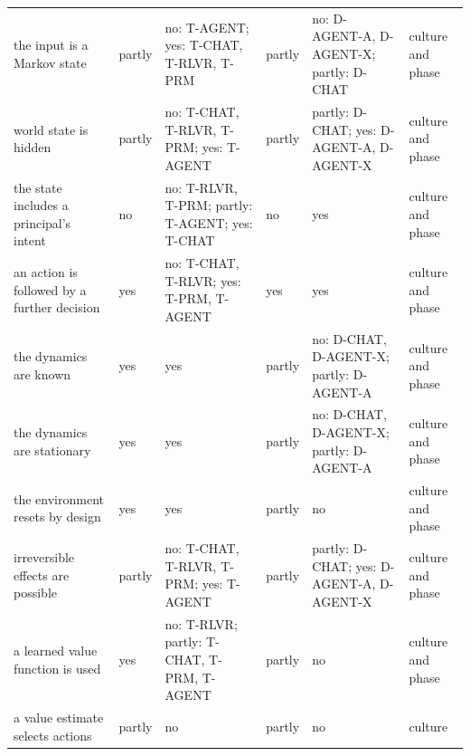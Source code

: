 \documentclass{article}
\begin{document}
\begin{table}[!htb]
\begin{tabularx}{\textwidth}{@{}>{\raggedright\arraybackslash}Xl>{\raggedright\arraybackslash}Xl>{\raggedright\arraybackslash}X>{\raggedright\arraybackslash}X@{}}
the input is a Markov state & partly & no: T-AGENT; yes: T-CHAT, T-RLVR, T-PRM & partly & no: D-AGENT-A, D-AGENT-X; partly: D-CHAT & culture and phase \\
world state is hidden & partly & no: T-CHAT, T-RLVR, T-PRM; yes: T-AGENT & partly & partly: D-CHAT; yes: D-AGENT-A, D-AGENT-X & culture and phase \\
the state includes a principal's intent & no & no: T-RLVR, T-PRM; partly: T-AGENT; yes: T-CHAT & no & yes & culture and phase \\
an action is followed by a further decision & yes & no: T-CHAT, T-RLVR; yes: T-PRM, T-AGENT & yes & yes & culture and phase \\
the dynamics are known & yes & yes & partly & no: D-CHAT, D-AGENT-X; partly: D-AGENT-A & culture and phase \\
the dynamics are stationary & yes & yes & partly & no: D-CHAT, D-AGENT-X; partly: D-AGENT-A & culture and phase \\
the environment resets by design & yes & yes & partly & no & culture and phase \\
irreversible effects are possible & partly & no: T-CHAT, T-RLVR, T-PRM; yes: T-AGENT & partly & partly: D-CHAT; yes: D-AGENT-A, D-AGENT-X & culture and phase \\
a learned value function is used & yes & no: T-RLVR; partly: T-CHAT, T-PRM, T-AGENT & partly & no & culture and phase \\
a value estimate selects actions & partly & no & partly & no & culture \\
\bottomrule
\end{tabularx}
\end{table}
\end{document}
